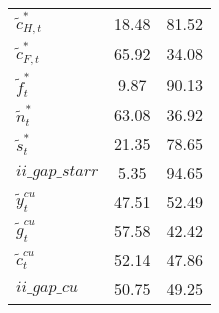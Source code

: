 \begin{center}
\begin{longtable}{lcc}
${\tilde c_{H,t}^*}       $	 & 	             18.48	 & 	             81.52 \\ 
${\tilde c_{F,t}^*}       $	 & 	             65.92	 & 	             34.08 \\ 
${\tilde f_t^*}           $	 & 	              9.87	 & 	             90.13 \\ 
${\tilde n_t^*}           $	 & 	             63.08	 & 	             36.92 \\ 
${\tilde s_t^*}           $	 & 	             21.35	 & 	             78.65 \\ 
$ii\_gap\_starr           $	 & 	              5.35	 & 	             94.65 \\ 
${\tilde y_t^{cu}}        $	 & 	             47.51	 & 	             52.49 \\ 
${\tilde g_t^{cu}}        $	 & 	             57.58	 & 	             42.42 \\ 
${\tilde c_t^{cu}}        $	 & 	             52.14	 & 	             47.86 \\ 
$ii\_gap\_cu              $	 & 	             50.75	 & 	             49.25 \\ 
\end{longtable}
 \end{center}
